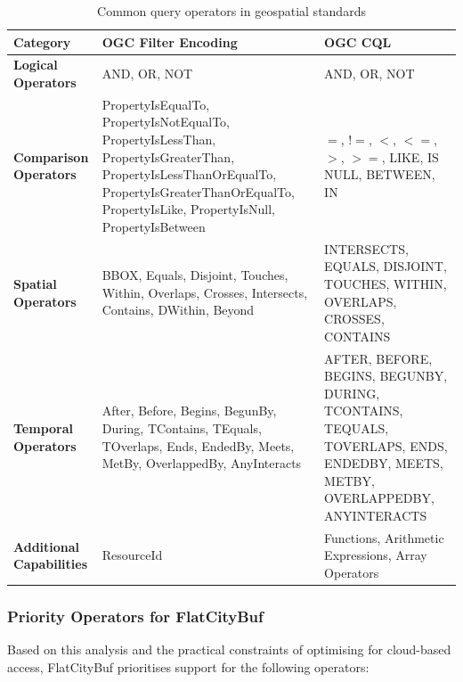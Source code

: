 \begin{table}[ht]
  \centering
  \caption{Common query operators in geospatial standards}
  \label{tab:query_operators}
  \begin{tabular}{p{3cm}p{5cm}p{5cm}}
    \hline
    \textbf{Category} & \textbf{OGC Filter Encoding} & \textbf{OGC CQL} \\
    \hline
    \textbf{Logical Operators} &
    AND, OR, NOT &
    AND, OR, NOT \\
    \hline
    \textbf{Comparison Operators} &
    PropertyIsEqualTo, PropertyIsNotEqualTo, PropertyIsLessThan, PropertyIsGreaterThan, PropertyIsLessThanOrEqualTo, PropertyIsGreaterThanOrEqualTo, PropertyIsLike, PropertyIsNull, PropertyIsBetween &
    $=$, $!=$, $<$, $<=$, $>$, $>=$, LIKE, IS NULL, BETWEEN, IN \\
    \hline
    \textbf{Spatial Operators} &
    BBOX, Equals, Disjoint, Touches, Within, Overlaps, Crosses, Intersects, Contains, DWithin, Beyond &
    INTERSECTS, EQUALS, DISJOINT, TOUCHES, WITHIN, OVERLAPS, CROSSES, CONTAINS \\
    \hline
    \textbf{Temporal Operators} &
    After, Before, Begins, BegunBy, During, TContains, TEquals, TOverlaps, Ends, EndedBy, Meets, MetBy, OverlappedBy, AnyInteracts &
    AFTER, BEFORE, BEGINS, BEGUNBY, DURING, TCONTAINS, TEQUALS, TOVERLAPS, ENDS, ENDEDBY, MEETS, METBY, OVERLAPPEDBY, ANYINTERACTS \\
    \hline
    \textbf{Additional Capabilities} &
    ResourceId &
    Functions, Arithmetic Expressions, Array Operators \\
    \hline
  \end{tabular}
\end{table}

\subsubsection{Priority Operators for FlatCityBuf}
\label{methodology:attribute_index:query_requirements:priorities}

Based on this analysis and the practical constraints of optimising for cloud-based access, FlatCityBuf prioritises support for the following operators:

